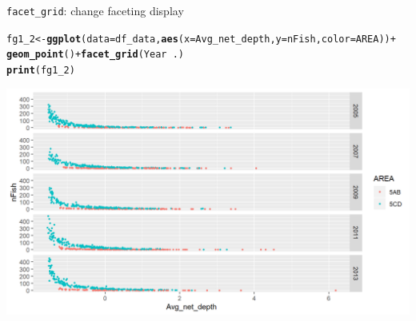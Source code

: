 \documentclass{beamer}\usepackage[]{graphicx}\usepackage[]{color}
\makeatletter
\newcommand{\hlopt}[1]{\textcolor[rgb]{0,0,0}{#1}}%
\newcommand{\hlstd}[1]{\textcolor[rgb]{0.345,0.345,0.345}{#1}}%
\newcommand{\hlkwb}[1]{\textcolor[rgb]{0.69,0.353,0.396}{#1}}%
\newcommand{\hlkwc}[1]{\textcolor[rgb]{0.333,0.667,0.333}{#1}}%
\newcommand{\hlkwd}[1]{\textcolor[rgb]{0.737,0.353,0.396}{\textbf{#1}}}%
\newenvironment{kframe}{%
 \def\at@end@of@kframe{}%
 \ifinner\ifhmode%
  \def\at@end@of@kframe{\end{minipage}}%
  \begin{minipage}{\columnwidth}%
 \fi\fi%
 \def\FrameCommand##1{\hskip\@totalleftmargin \hskip-\fboxsep
 \colorbox{shadecolor}{##1}\hskip-\fboxsep
     \hskip-\linewidth \hskip-\@totalleftmargin \hskip\columnwidth}%
 \MakeFramed {\advance\hsize-\width
   \@totalleftmargin\z@ \linewidth\hsize
   \@setminipage}}%
 {\par\unskip\endMakeFramed%
 \at@end@of@kframe}
\newenvironment{knitrout}{}{} %
\makeatother
\begin{document}
\begin{frame}[fragile]{\lstinline{facet_grid}: change faceting display}
\begin{knitrout}\footnotesize
{}\color{fgcolor}\begin{kframe}
\begin{alltt}
\hlstd{fg1_2} \hlkwb{<-} \hlkwd{ggplot}\hlstd{(}\hlkwc{data}\hlstd{=df_data,} \hlkwd{aes}\hlstd{(}\hlkwc{x}\hlstd{=Avg_net_depth,} \hlkwc{y}\hlstd{=nFish,} \hlkwc{color}\hlstd{=AREA))} \hlopt{+}
  \hlkwd{geom_point}\hlstd{()} \hlopt{+} \hlkwd{facet_grid}\hlstd{(Year} \hlopt{~} \hlstd{.)}
\hlkwd{print}\hlstd{(fg1_2)}
\end{alltt}
\end{kframe}

{\centering \includegraphics[width=.9\linewidth]{figure/facet_grid_2-1} 

}



\end{knitrout}
\end{frame}
\end{document}
